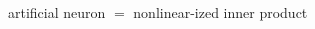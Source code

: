 \documentclass[xcolor={svgnames},
               hyperref={colorlinks,citecolor=DeepPink4,linkcolor=FireBrick,urlcolor=Maroon}]
               {beamer}
\begin{document}
\begin{frame}{artificial neuron $=$ nonlinear-ized inner product}
\begin{columns}
\begin{column}{0.45\textwidth}
\end{column}
\end{columns}
\end{frame}
\end{document}
